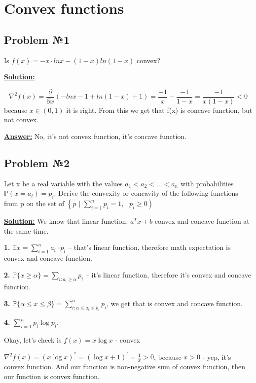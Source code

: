 \section{Convex functions}

\subsection{Problem №1}
Is $f(x) = -x \cdot lnx - (1-x)ln(1-x)$ convex?

\underline{\textbf{Solution:}}

\begin{equation*}
    \nabla^2 f(x) = \frac{\partial}{\partial x} \left( -lnx - 1 + ln(1-x) + 1\right) = \frac{-1}{x} - \frac{-1}{1-x} = \frac{-1}{x(1-x)} < 0
\end{equation*}
because $x \in (0, 1)$ it is right. From this we get that f(x) is concave function, but not convex.

\underline{\textbf{Answer:}} No, it's not convex function, it's concave function.

\subsection{Problem №2}
Let x be a real variable with the values $a_1 < a_2 < ... < a_n$ with probabilities $\mathds{P} (x = a_i) = p_i$. Derive the convexity or concavity of the following functions from p on the set of $\left\{p \text{ | } \sum\limits_{i = 1}^n p_i = 1, \text{ } p_i \geq 0 \right)$

\underline{\textbf{Solution:}}
We know that linear function: $a^Tx + b$ convex and concave function at the same time.

\textbf{1.} $\mathds{E}x = \sum\limits_{i = 1}^n a_i \cdot p_i$ -- that's linear function, therefore math expectation is convex and concave function.

\textbf{2.} $\mathds{P} \{x \geq \alpha \} = \sum\limits_{i: a_i \geq \alpha} p_i$ -- it's linear function, therefore it's convex and concave function.

\textbf{3.} $\mathds{P} \{\alpha \leq x \leq \beta \} = \sum\limits_{i: \alpha \leq a_i \leq b_i}^n p_i$, we get that is convex and concave function.

\textbf{4.} $\sum\limits_{i = 1}^n p_i \log p_i$.

Okay, let's check is $f(x) = x \log x $ - convex

$\nabla^2f(x) = (x \log x)^{''} = (\log x + 1)^{'} = \frac{1}{x} > 0$, because $x > 0$ - yep, it's convex function. And our function is non-negative sum of convex function, then our function is convex function.

